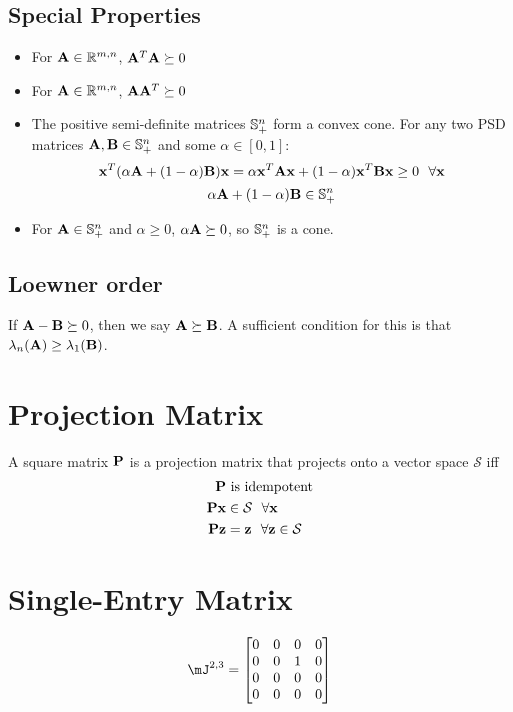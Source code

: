\subsection*{Special Properties}
\begin{itemize}
\item For $\mathbf{A}\in\mathbb{R}^{m,n}$, $\mathbf{A}^T\mathbf{A}\succeq0$
\item For $\mathbf{A}\in\mathbb{R}^{m,n}$, $\mathbf{A}\mathbf{A}^T\succeq0$
\item The positive semi-definite matrices $\mathbb{S}^n_+$ form a convex cone. For any two PSD matrices $\mathbf{A},\mathbf{B}\in\mathbb{S}^n_+$ and some $\alpha\in[0,1]$:
\begin{equation}
\mathbf{x}^T(\alpha\mathbf{A}+(1-\alpha)\mathbf{B})\mathbf{x}=\alpha \mathbf{x}^T\mathbf{A}\mathbf{x}+(1-\alpha)\mathbf{x}^T\mathbf{B}\mathbf{x}\ge0~~\forall\mathbf{x}
\end{equation}
\begin{equation}
\alpha\mathbf{A}+(1-\alpha)\mathbf{B}\in\mathbb{S}^n_+
\end{equation}
\item For $\mathbf{A}\in\mathbb{S}^n_+$ and $\alpha\ge0$, $\alpha\mathbf{A}\succeq0$, so $\mathbb{S}^n_+$ is a cone.
\end{itemize}

\subsection{Loewner order}
If $\mathbf{A}-\mathbf{B}\succeq 0$, then we say $\mathbf{A}\succeq \mathbf{B}$. A sufficient condition for this is that $\lambda_n(\mathbf{A})\ge\lambda_1(\mathbf{B})$.



\section{Projection Matrix}
A square matrix $\mathbf{P}$ is a projection matrix that projects onto a vector space $\mathcal{S}$ iff
\begin{align}
\mathbf{P}&~\textrm{is idempotent} \\
\mathbf{P}\mathbf{x}&\in\mathcal{S}~~\forall\mathbf{x} \\
\mathbf{P}\mathbf{z}&=\mathbf{z}~~\forall\mathbf{z}\in\mathcal{S}
\end{align}


\section{Single-Entry Matrix}
\label{sec:rogue_single_entry} 
\begin{equation}
\mJ^{2,3} =
\begin{bmatrix}
0 & 0 & 0 & 0 \\
0 & 0 & 1 & 0 \\
0 & 0 & 0 & 0 \\
0 & 0 & 0 & 0
\end{bmatrix}
\end{equation}

